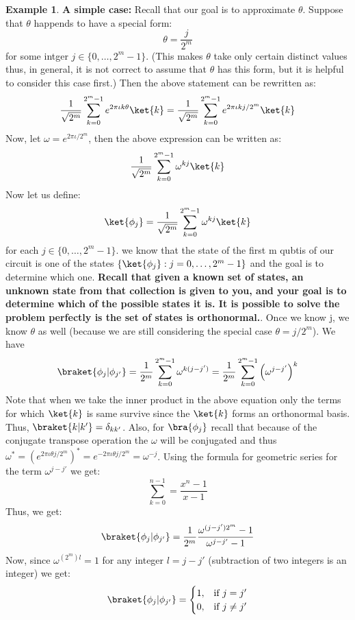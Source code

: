 \documentclass[12pt, oneside]{book}
\theoremstyle{definition}
\theoremstyle{definition}
\newtheorem{example}{Example}[section]
\theoremstyle{remark}
\begin{document}
\begin{example}
    \textbf{A simple case: }Recall that our goal is to approximate $\theta$. Suppose that $\theta$ happends to have a special form: 
    \[ 
    \theta = \frac{j}{2^m}
    \]
    for some intger $j \in \{0,\ldots,2^{m}-1\}$. (This makes $\theta$ take only certain distinct values thus, in general, it is not correct to assume that $\theta$ has this form, but it is helpful to consider this case first.)
    Then the above statement can be rewritten as:
    \[
    \frac{1}{\sqrt{2^m}}\sum_{k=0}^{2^m-1}e^{2\pi\iota k\theta}\ket{k}=\frac{1}{\sqrt{2^m}}\sum_{k=0}^{2^m-1}e^{2\pi\iota kj/2^m}\ket{k}
    \]
    Now, let $\omega=e^{2\pi\iota/2^m}$, then the above expression can be written as:
    \[
    \frac{1}{\sqrt{2^m}}\sum_{k=0}^{2^m-1}\omega^{kj}\ket{k}
    \]
    Now let us define: 
    \[
    \ket{\phi_j}=\frac{1}{\sqrt{2^m}}\sum_{k=0}^{2^m-1}\omega^{kj}\ket{k}
    \]
    for each $j \in \{0,\ldots,2^m-1\}$. we know that the state of the first m qubtis of our circuit is one of the states
    $\{\ket{\phi_j}:j=0,\ldots,2^m-1\}$ and the goal is to determine which one. \textbf{Recall that given a known set of states, an unknown state from that collection is given to you, and your goal is to determine which of the possible states it is.
    It is possible to solve the problem perfectly is the set of states is orthonormal.}. Once we know j, we know $\theta$ as well (because we are still considering the special case $\theta=j/2^m$).
    We have
    \[
    \braket{\phi_j|\phi_{j'}}=\frac{1}{2^m}\sum_{k=0}^{2^m-1}\omega^{k(j-j')}=\frac{1}{2^m}\sum_{k=0}^{2^m-1}\left(\omega^{j-j'}\right)^k
    \]
    Note that when we take the inner product in the above equation only the terms for which $\ket{k}$ is same survive since the $\ket{k}$ forms an orthonormal basis. Thus, $\braket{k|k'}=\delta_{kk'}$.
    Also, for $\bra{\phi_j}$ recall that because of the conjugate transpose operation the $\omega$ will be conjugated and thus $\omega^{*}=\left(e^{2\pi\iota\theta j/2^m}\right)^*=e^{-2\pi\iota\theta j/2^m}=\omega^{-j}$.
    Using the formula for geometric series for the term $\omega^{j-j'}$ we get:
    \[
    \sum_{k=0}^{n-1}=\frac{x^n-1}{x-1}
    \]
    Thus, we get:
    \[
    \braket{\phi_j|\phi_{j'}}=\frac{1}{2^m}\frac{\omega^{(j-j')2^m}-1}{\omega^{j-j'}-1}
    \]
    Now, since $\omega^{(2^m)l}=1$ for any integer $l=j-j'$ (subtraction of two integers is an integer) we get:
    \[
        \braket{\phi_j|\phi_{j'}} = \begin{cases} 1, & \text{if } j=j' \\ 0, & \text{if } j\neq j' \end{cases}
\]
\end{example}
\end{document}
